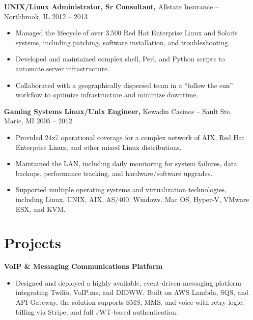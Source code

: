 \documentclass[11pt]{article}
\begin{document}
{\large\textbf{UNIX/Linux Administrator, Sr Consultant,}} {Allstate Insurance} -- Northbrook, IL \hfill 2012 -- 2013 \\
\vspace{-9pt}
\begin{itemize}
    \item Managed the lifecycle of over 3,500 Red Hat Enterprise Linux and Solaris systems, including patching, software installation, and troubleshooting.
    \item Developed and maintained complex shell, Perl, and Python scripts to automate server infrastructure.
    \item Collaborated with a geographically dispersed team in a “follow the sun” workflow to optimize infrastructure and minimize downtime.
\end{itemize}

{\large\textbf{Gaming Systems Linux/Unix Engineer,}} {Kewadin Casinos} -- Sault Ste. Marie, MI \hfill 2005 -- 2012 \\
\vspace{-9pt}
\begin{itemize}
    \item Provided 24x7 operational coverage for a complex network of AIX, Red Hat Enterprise Linux, and other mixed Linux distributions.
    \item Maintained the LAN, including daily monitoring for system failures, data backups, performance tracking, and hardware/software upgrades.
    \item Supported multiple operating systems and virtualization technologies, including Linux, UNIX, AIX, AS/400, Windows, Mac OS, Hyper-V, VMware ESX, and KVM.
\end{itemize}

\vspace{-18.5pt}

\section*{Projects}
{\large\textbf{VoIP \& Messaging Communications Platform}} \\
\vspace{-9pt}
\begin{itemize}
  \item Designed and deployed a highly available, event-driven messaging platform integrating Twilio, VoIP.ms, and DIDWW. Built on AWS Lambda, SQS, and API Gateway, the solution supports SMS, MMS, and voice with retry logic, billing via Stripe, and full JWT-based authentication.
\end{itemize}
\end{document}
